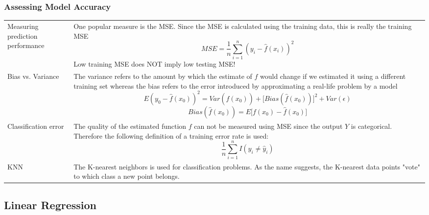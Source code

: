 \subsubsection{Assessing Model Accuracy}
\begin{onehalfspace}
	\begin{tabularx}{\textwidth}{p{3cm}X}
		Measuring prediction performance & One popular measure is the MSE. Since the MSE is calculated using the training data, this is really the training MSE \[ MSE = \frac{1}{n} \sum_{i=1}^{n} (y_i-\hat{f} (x_i))^2 \]
		Low training MSE does NOT imply low testing MSE! \\
		Bias vs. Variance & The variance refers to the amount by which the estimate of $f$ would change if we estimated it using a different training set whereas the bias refers to the error introduced by approximating a real-life	problem by a model
		\[ E(y_0 -\hat{f}(x_0))^2 = Var(\hat{f}(x_0)) + \lbrack Bias(\hat{f}(x_0))\rbrack ^2 +Var(\epsilon ) \]
		\[ Bias(\hat{f}(x_0)) = E\lbrack f(x_0)-\hat{f}(x_0)\rbrack \] \\
		Classification error & The quality of the estimated function $f$ can not be measured using MSE since the output $Y$ is categorical. Therefore the following definition of a training error rate is used:
		\[ \frac{1}{n} \sum_{i=1}^{n} I(y_i\neq \hat{y}_i) \] \\
		KNN & The K-nearest neighbors is used for classification problems. As the name suggests, the K-nearest data points	"vote"{} to which class a new point belongs. \\
	\end{tabularx}
\end{onehalfspace}

\subsection{Linear Regression}
